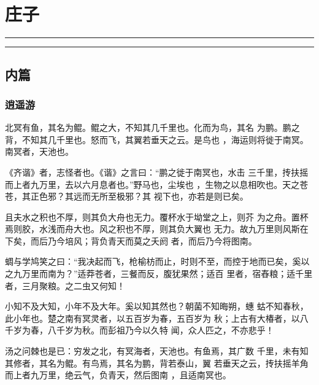 \documentclass[]{article}
\date{}
\begin{document}
\hypertarget{header-n498}{%
\section{庄子}\label{header-n498}}

\begin{center}\rule{0.5\linewidth}{\linethickness}\end{center}

\tableofcontents

\begin{center}\rule{0.5\linewidth}{\linethickness}\end{center}

\hypertarget{header-n506}{%
\subsection{内篇}\label{header-n506}}

\hypertarget{header-n507}{%
\subsubsection{逍遥游}\label{header-n507}}

北冥有鱼，其名为鲲。鲲之大，不知其几千里也。化而为鸟，其名
为鹏。鹏之背，不知其几千里也。怒而飞，其翼若垂天之云。是鸟也
，海运则将徙于南冥。南冥者，天池也。

《齐谐》者，志怪者也。《谐》之言曰：``鹏之徙于南冥也，水击
三千里，抟扶摇而上者九万里，去以六月息者也。''野马也，尘埃也
，生物之以息相吹也。天之苍苍，其正色邪？其远而无所至极邪？其
视下也，亦若是则已矣。

且夫水之积也不厚，则其负大舟也无力。覆杯水于坳堂之上，则芥
为之舟。置杯焉则胶，水浅而舟大也。风之积也不厚，则其负大翼也
无力。故九万里则风斯在下矣，而后乃今培风；背负青天而莫之夭阏
者，而后乃今将图南。

蜩与学鸠笑之曰：``我决起而飞，枪榆枋而止，时则不至，而控于地而已矣，奚以之九万里而南为？''适莽苍者，三餐而反，腹犹果然；适百
里者，宿舂粮；适千里者，三月聚粮。之二虫又何知！

小知不及大知，小年不及大年。奚以知其然也？朝菌不知晦朔，蟪
蛄不知春秋，此小年也。楚之南有冥灵者，以五百岁为春，五百岁为
秋；上古有大椿者，以八千岁为春，八千岁为秋。而彭祖乃今以久特
闻，众人匹之，不亦悲乎！

汤之问棘也是已：穷发之北，有冥海者，天池也。有鱼焉，其广数
千里，未有知其修者，其名为鲲。有鸟焉，其名为鹏，背若泰山，翼
若垂天之云，抟扶摇羊角而上者九万里，绝云气，负青天，然后图南
，且适南冥也。
\end{document}
